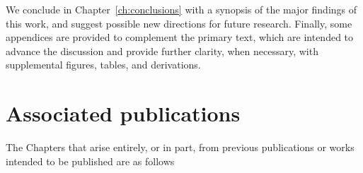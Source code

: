 We conclude in Chapter~\ref{ch:conclusions} 
with a synopsis of the major findings of this work, 
and suggest possible new directions for future research.
%
Finally, some appendices are provided 
to complement the primary text, 
which are intended to 
advance the discussion and 
provide further clarity, when necessary, 
with supplemental figures, tables, and derivations.




\newpage
\section{Associated publications}

The Chapters that arise entirely, or in part, 
from previous publications 
or works intended to be published 
are as follows
\vspace{3em}

